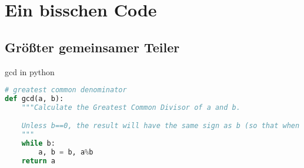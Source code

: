 \section{Ein bisschen Code}
\subsection{Größter gemeinsamer Teiler}
\begin{frame}[fragile]
    \begin{block}{gcd in python}
        \begin{lstlisting}[language=python]
# greatest common denominator
def gcd(a, b):
    """Calculate the Greatest Common Divisor of a and b.

    Unless b==0, the result will have the same sign as b (so that when b is divided by it, the result comes out positive).
    """
    while b:
        a, b = b, a%b
    return a
        \end{lstlisting}
    \end{block}
\end{frame}